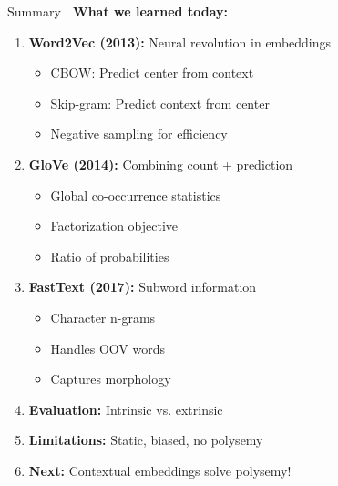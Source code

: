 \documentclass[aspectratio=169]{beamer}
\begin{document}
\begin{frame}[shrink=10]{Summary 🎯}
\textbf{What we learned today:}

\begin{enumerate}\setlength{\itemsep}{0pt}
    \item \textbf{Word2Vec (2013):} Neural revolution in embeddings
    \begin{itemize}\setlength{\itemsep}{0pt}
        \item CBOW: Predict center from context
        \item Skip-gram: Predict context from center
        \item Negative sampling for efficiency
    \end{itemize}

    \item \textbf{GloVe (2014):} Combining count + prediction
    \begin{itemize}\setlength{\itemsep}{0pt}
        \item Global co-occurrence statistics
        \item Factorization objective
        \item Ratio of probabilities
    \end{itemize}

    \item \textbf{FastText (2017):} Subword information
    \begin{itemize}\setlength{\itemsep}{0pt}
        \item Character n-grams
        \item Handles OOV words
        \item Captures morphology
    \end{itemize}

    \item \textbf{Evaluation:} Intrinsic vs. extrinsic

    \item \textbf{Limitations:} Static, biased, no polysemy

    \item \textbf{Next:} Contextual embeddings solve polysemy!
\end{enumerate}
\end{frame}
\end{document}
